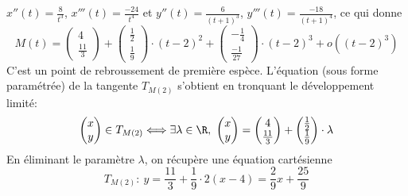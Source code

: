 {\begin{enumerate}
{$x''(t)=\frac{8}{t^3}$, $x'''(t)=\frac{-24}{t^4}$ et $y''(t)=\frac{6}{(t+1)^3}$, $y'''(t)=\frac{-18}{(t+1)^4}$, ce qui donne
$$M(t)=\begin{pmatrix}4 \\ \frac{11}{3}\end{pmatrix}+
\begin{pmatrix}\frac{1}{2}\\\frac{1}{9}\end{pmatrix}\cdot (t-2)^2+
\begin{pmatrix}-\frac{1}{4}\\ \frac{-1}{27}\end{pmatrix}\cdot (t-2)^3+o((t-2)^3)$$
C'est un point de rebroussement de première espèce. L'équation (sous forme paramétrée) de la tangente $T_{M(2)}$ s'obtient en tronquant le développement limité:
$$\begin{pmatrix}x\\ y\end{pmatrix}\in T_{M(2)}
\Longleftrightarrow\exists\lambda\in\R,\ \begin{pmatrix}x \\ y\end{pmatrix}
=\begin{pmatrix}4\\  \frac{11}{3}\end{pmatrix}+
\begin{pmatrix}\frac{1}{2}\\\frac{1}{9}\end{pmatrix}\cdot \lambda$$
En éliminant le paramètre $\lambda$, on récupère une équation cartésienne 
$$T_{M(2)}:\ y=\frac{11}{3}+\frac{1}{9}\cdot 2(x-4)=\frac{2}{9}x+\frac{25}{9}$$
}
\end{enumerate}
}
